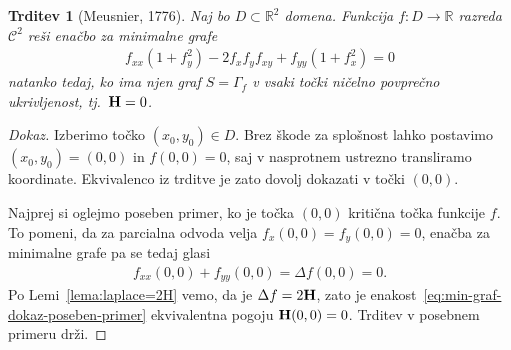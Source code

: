 \documentclass[12pt,a4paper,twoside]{article}
\theoremstyle{definition} %
\newenvironment{dokaz}[1][Dokaz]{\begin{proof}[#1]}{\end{proof}}
\theoremstyle{plain} %
\newtheorem{trditev}[definicija]{Trditev}
\numberwithin{equation}{section}  %
\newcommand{\R}{\mathbb R}
\begin{document}
\begin{trditev} [Meusnier, 1776] \label{trd:min-graf-H=0}
Naj bo $D \subset \R^2$ domena. Funkcija $f \colon D \to \R$ razreda $\mathcal{C}^2$ reši enačbo za minimalne grafe
\begin{gather*}
f_{xx}(1+f_{y}^2) - 2f_{x}f_{y}f_{xy} + f_{yy}(1+f_{x}^2) = 0
\end{gather*}
natanko tedaj, ko ima njen graf $S = \Gamma_{f}$ v vsaki točki ničelno povprečno ukrivljenost, tj.~$\textup{\textbf{H}} = 0$.
\end{trditev}

\begin{dokaz}
Izberimo točko $(x_0,y_0) \in D$. Brez škode za splošnost lahko postavimo $(x_0,y_0)=(0,0)$ in $f(0,0)=0$, saj v nasprotnem ustrezno transliramo koordinate. Ekvivalenco iz trditve je zato dovolj dokazati v točki $(0,0)$.

Najprej si oglejmo poseben primer, ko je točka $(0,0)$ kritična točka funkcije $f$. To pomeni, da za parcialna odvoda velja $f_{x}(0,0)=f_{y}(0,0)=0$, enačba za minimalne grafe pa se tedaj glasi
\begin{gather} \label{eq:min-graf-dokaz-poseben-primer}
f_{xx}(0,0) + f_{yy}(0,0) = \Delta f(0,0) = 0.
\end{gather}
Po Lemi~\ref{lema:laplace=2H} vemo, da je $\Delta f = 2\textup{\textbf{H}}$, zato je enakost~\eqref{eq:min-graf-dokaz-poseben-primer} ekvivalentna pogoju $\textup{\textbf{H}}(0,0) = 0$. Trditev v posebnem primeru drži.


\end{dokaz}
\end{document}
